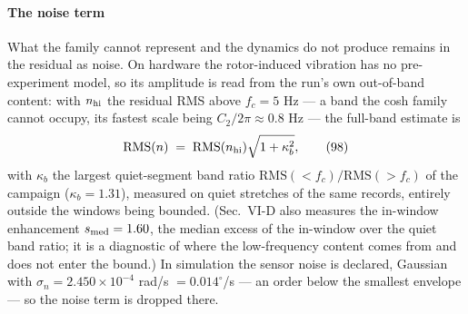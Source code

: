 \documentclass[10pt]{article}
\newcommand{\rms}{\mathrm{RMS}}
\begin{document}
\paragraph*{The noise term}
What the family cannot represent and the dynamics do not produce
remains in the residual as noise. On hardware the rotor-induced
vibration has no pre-experiment model, so its amplitude is read
from the run's own out-of-band content: with $n_{\rm hi}$ the
residual RMS above $f_c = 5$ Hz --- a band the cosh family cannot
occupy, its fastest scale being $C_2/2\pi \approx 0.8$ Hz --- the
full-band estimate is
\begin{equation}
  \rms(n) \;=\; \rms(n_{\rm hi})
  \sqrt{1 + \kappa_b^2},
  \tag{98}
\end{equation}
with $\kappa_b$ the largest quiet-segment band ratio
$\rms({<}f_c)/\rms({>}f_c)$ of the campaign
($\kappa_b = 1.31$), measured on quiet stretches of the same
records, entirely outside the windows being bounded. (Sec.~VI-D
also measures the in-window enhancement $s_{\rm med} = 1.60$, the
median excess of the in-window over the quiet band ratio; it is a
diagnostic of where the low-frequency content comes from and does
not enter the bound.) In
simulation the sensor noise is declared, Gaussian with
$\sigma_n = 2.450\times10^{-4}$ rad/s $= 0.014^\circ$/s --- an
order below the smallest envelope --- so the noise term is dropped
there.
\end{document}
